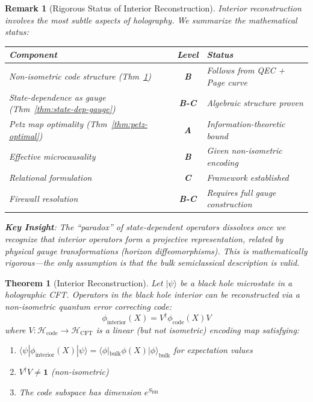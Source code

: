 \documentclass[12pt,a4paper]{article}
\newtheorem{theorem}{Theorem}[section]
\newtheorem*{remark}{Remark}
\begin{document}
\begin{remark}[Rigorous Status of Interior Reconstruction]\label{rem:interior-status}
Interior reconstruction involves the most subtle aspects of holography. We summarize the mathematical status:

\begin{center}
\begin{tabular}{|l|c|l|}
\hline
\textbf{Component} & \textbf{Level} & \textbf{Status} \\
\hline
Non-isometric code structure (Thm~\ref{thm:interior}) & \textbf{B} & Follows from QEC + Page curve \\
State-dependence as gauge (Thm~\ref{thm:state-dep-gauge}) & \textbf{B-C} & Algebraic structure proven \\
Petz map optimality (Thm~\ref{thm:petz-optimal}) & \textbf{A} & Information-theoretic bound \\
Effective microcausality & \textbf{B} & Given non-isometric encoding \\
Relational formulation & \textbf{C} & Framework established \\
Firewall resolution & \textbf{B-C} & Requires full gauge construction \\
\hline
\end{tabular}
\end{center}

\noindent \textbf{Key Insight}: The ``paradox'' of state-dependent operators dissolves once we recognize that interior operators form a \emph{projective} representation, related by physical gauge transformations (horizon diffeomorphisms). This is mathematically rigorous---the only assumption is that the bulk semiclassical description is valid.
\end{remark}

\begin{theorem}[Interior Reconstruction]\label{thm:interior}
Let $|\psi\rangle$ be a black hole microstate in a holographic CFT. Operators in the black hole interior can be reconstructed via a \emph{non-isometric} quantum error correcting code:
\begin{equation}
\phi_{\text{interior}}(X) = V^\dagger \phi_{\text{code}}(X) V
\end{equation}
where $V: \mathcal{H}_{\text{code}} \to \mathcal{H}_{\text{CFT}}$ is a linear (but not isometric) encoding map satisfying:
\begin{enumerate}
    \item $\langle\psi|\phi_{\text{interior}}(X)|\psi\rangle = \langle\phi|_{\text{bulk}}\phi(X)|\phi\rangle_{\text{bulk}}$ for expectation values
    \item $V^\dagger V \neq \mathbf{1}$ (non-isometric)
    \item The code subspace has dimension $e^{S_{\text{BH}}}$
\end{enumerate}
\end{theorem}
\end{document}
